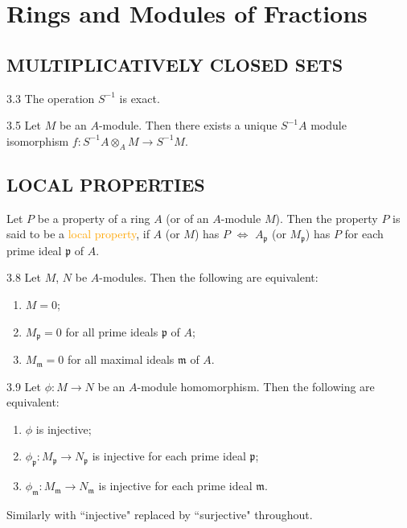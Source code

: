 \chapter{Rings and Modules of Fractions}

\section*{MULTIPLICATIVELY CLOSED SETS}

\begin{proposition}{3.3}
	The operation $S^{-1}$ is exact.
\end{proposition}

\begin{proposition}{3.5}
	Let $M$ be an $A$-module. Then there exists a unique $S^{-1}A$ module isomorphism $f:S^{-1}A\otimes_AM\rightarrow S^{-1}M$.
\end{proposition}

\section*{LOCAL PROPERTIES}

Let $P$ be a property of a ring $A$ (or of an $A$-module $M$). Then the property $P$ is said to be a \textcolor{orange}{local property}, if $A$ (or $M$) has $P$ $\Leftrightarrow$ $A_\mathfrak{p}$ (or $M_\mathfrak{p}$) has $P$ for each prime ideal $\mathfrak{p}$ of $A$.

\begin{proposition}{3.8}
	Let $M$, $N$ be $A$-modules. Then the following are equivalent:
	\begin{enumerate}[label=\textup{(\roman*)}]
		\item $M=0$;
		\item $M_\mathfrak{p}=0$ for all prime ideals $\mathfrak{p}$ of $A$;
		\item $M_\mathfrak{m}=0$ for all maximal ideals $\mathfrak{m}$ of $A$.
	\end{enumerate}
\end{proposition}

\begin{proposition}{3.9}
	Let $\phi:M\rightarrow N$ be an $A$-module homomorphism. Then the following are equivalent:
	\begin{enumerate}[label=\textup{(\roman*)}]
		\item $\phi$ is injective;
		\item $\phi_\mathfrak{p}:M_\mathfrak{p}\rightarrow N_\mathfrak{p}$ is injective for each prime ideal $\mathfrak{p}$;
		\item $\phi_\mathfrak{m}:M_\mathfrak{m}\rightarrow N_\mathfrak{m}$ is injective for each prime ideal $\mathfrak{m}$.
	\end{enumerate}
	Similarly with ``injective" replaced by ``surjective" throughout.
\end{proposition}

